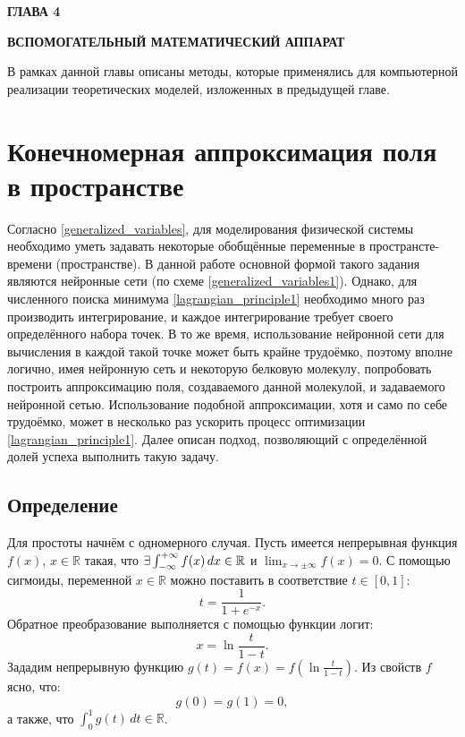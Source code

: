 \newpage
\begin{center}
	\textbf{\large ГЛАВА 4}

	\textbf{\large ВСПОМОГАТЕЛЬНЫЙ МАТЕМАТИЧЕСКИЙ АППАРАТ}
\end{center}

В рамках данной главы описаны методы, которые применялись для компьютерной реализации теоретических моделей, изложенных в предыдущей главе.

\section{Конечномерная аппроксимация поля в пространстве}
Согласно \ref{generalized_variables}, для моделирования физической системы необходимо уметь задавать некоторые обобщённые переменные в пространсте-времени (пространстве). В данной работе основной формой такого задания являются нейронные сети (по схеме \ref{generalized_variables1}). Однако, для численного поиска минимума \ref{lagrangian_principle1} необходимо много раз производить  интегрирование, и каждое интегрирование требует своего определённого набора точек. В то же время, использование нейронной сети для вычисления в каждой такой точке может быть крайне трудоёмко, поэтому вполне логично, имея нейронную сеть и некоторую белковую молекулу, попробовать построить аппроксимацию поля, создаваемого данной молекулой, и задаваемого нейронной сетью. Использование подобной аппроксимации, хотя и само по себе трудоёмко, может в несколько раз ускорить процесс оптимизации \ref{lagrangian_principle1}. Далее описан подход, позволяющий с определённой долей успеха выполнить такую задачу. 

\subsection{Определение}
Для простоты начнём с одномерного случая. Пусть имеется непрерывная функция $f(x)$, $x \in \mathbb{R}$ такая, что $\exists \int_{-\infty}^{+\infty} f(x) \, dx \in \mathbb{R}$ и
$\lim_{x \to \pm\infty}f(x) = 0$. С помощью сигмоиды, переменной $x \in \mathbb{R}$ можно поставить в соответствие $t \in [0, 1]$:
\begin{equation}
	t = \frac{1}{1 + e^{-x}}.
	\label{t_and_x}
\end{equation}
Обратное преобразование выполняется с помощью функции логит:
\begin{equation}
	x = \ln\frac{t}{1-t}.
	\label{x_and_t}
\end{equation}
Зададим непрерывную функцию $g(t) = f(x) = f(\ln\frac{t}{1-t})$. Из свойств $f$ ясно, что:
\begin{equation}
	g(0) = g(1) = 0,
	\label{g_zeros}
\end{equation}
а также, что $\int_0^1g(t) \, dt \in \mathbb{R}$.

